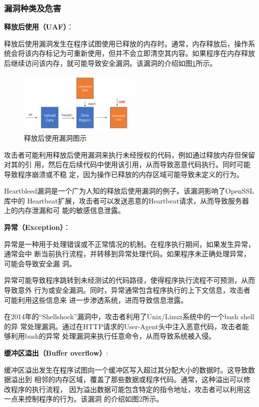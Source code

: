 \subsubsection{漏洞种类及危害}
\textbf{释放后使用（UAF）}：

释放后使用漏洞发生在程序试图使用已释放的内存时。通常，内存释放后，操作系统会将该内存标记为可重新使用，但并不会立即清空其内容。如果程序在内存释放后继续访问该内存，就可能导致安全漏洞。该漏洞的介绍如图\ref{fig:UAF}所示。
	\begin{figure}[htbp]
		\centering
		\includegraphics[width=0.5\textwidth]{pictures/UAF.png}
		\caption{释放后使用漏洞图示}
		\label{fig:UAF}
	\end{figure}
攻击者可能利用释放后使用漏洞来执行未经授权的代码，例如通过释放内存但保留对其的引
用，然后在后续代码中使用该引用，从而导致恶意代码执行。同时可能导致程序崩溃或不稳
定，因为操作已释放的内存区域可能导致未定义的行为。

Heartbleed漏洞是一个广为人知的释放后使用漏洞的例子。该漏洞影响了OpenSSL库中的
Heartbeat扩展，攻击者可以发送恶意的Heartbeat请求，从而导致服务器上的内存泄漏和可
能的敏感信息泄露。

\textbf{异常（Exception）}：
	
异常是一种用于处理错误或不正常情况的机制。在程序执行期间，如果发生异常，通常会中
断当前执行流程，并转移到异常处理代码。如果程序未正确处理异常，可能会导致安全漏
洞。

异常可能导致程序跳转到未经测试的代码路径，使得程序执行流程不可预测，从而导致意外
行为或安全漏洞。同时，异常通常包含程序执行的上下文信息，攻击者可能利用这些信息来
进一步渗透系统，进而导致信息泄露。

在2014年的``Shellshock''漏洞中，攻击者利用了Unix/Linux系统中的一个bash shell的异
常处理漏洞。通过在HTTP请求的User-Agent头中注入恶意代码，攻击者能够利用bash的异常
处理漏洞来执行任意命令，从而导致系统被入侵。
	
\textbf{缓冲区溢出（Buffer overflow）}:
	
缓冲区溢出发生在程序试图向一个缓冲区写入超过其分配大小的数据时。这导致数据溢出到
相邻的内存区域，覆盖了那些数据或程序代码。通常，这种溢出可以修改程序的执行流程，
因为溢出数据可能包含特定的指令地址，攻击者可以利用这一点来控制程序的行为。该漏洞
的介绍如图2所示。
	
